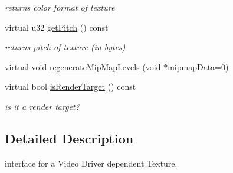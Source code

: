 \begin{DoxyCompactItemize}
\begin{DoxyCompactList}\small\item\em returns color format of texture \end{DoxyCompactList}\item 
\hypertarget{classirr_1_1video_1_1_c_software_texture_a8ea759e88b3dc2efabae3ef8e08b40cb}{virtual u32 \hyperlink{classirr_1_1video_1_1_c_software_texture_a8ea759e88b3dc2efabae3ef8e08b40cb}{get\-Pitch} () const }\label{classirr_1_1video_1_1_c_software_texture_a8ea759e88b3dc2efabae3ef8e08b40cb}

\begin{DoxyCompactList}\small\item\em returns pitch of texture (in bytes) \end{DoxyCompactList}\item 
virtual void \hyperlink{classirr_1_1video_1_1_c_software_texture_ada91d0d67e35e484b7ff9d263c25f55c}{regenerate\-Mip\-Map\-Levels} (void $\ast$mipmap\-Data=0)
\item 
\hypertarget{classirr_1_1video_1_1_c_software_texture_ade74e0debd7a98d9152894a6d35fc23d}{virtual bool \hyperlink{classirr_1_1video_1_1_c_software_texture_ade74e0debd7a98d9152894a6d35fc23d}{is\-Render\-Target} () const }\label{classirr_1_1video_1_1_c_software_texture_ade74e0debd7a98d9152894a6d35fc23d}

\begin{DoxyCompactList}\small\item\em is it a render target? \end{DoxyCompactList}\end{DoxyCompactItemize}


\subsection{Detailed Description}
interface for a Video Driver dependent Texture. 


